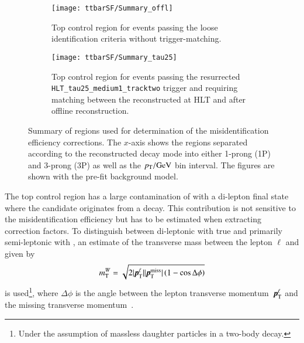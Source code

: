 \begin{figure}[htbp]
  \centering

  \begin{subfigure}[t]{.485\textwidth}
    \texttt{[image: ttbarSF/Summary\_offl]}
    \caption{Top control region for events passing the loose
      \tauhadvis identification criteria without trigger-matching.}
  \end{subfigure}\hfill%
  \begin{subfigure}[t]{.485\textwidth}
    \texttt{[image: ttbarSF/Summary\_tau25]}
    \caption{Top control region for events passing the resurrected
      \texttt{HLT\_tau25\_medium1\_tracktwo} trigger and requiring
      matching between the reconstructed \tauhadvis at HLT and after
      offline \tauhadvis reconstruction.}
  \end{subfigure}

  \caption{Summary of regions used for determination of the
    \jettotauhadvis misidentification efficiency corrections. The
    $x$-axis shows the regions separated according to the
    reconstructed decay mode into either 1-prong (1P) and 3-prong (3P)
    \tauhadvis as well as the \tauhadvis $\pT /\si{\GeV}$ bin
    interval. The figures are shown with the pre-fit background
    model.}
  \label{fig:ttbarsf_region_summary_prefit}
\end{figure}

The top control region has a large contamination of \ttbar with a
di-lepton final state where the \tauhadvis candidate originates from a
\tauhad decay. This contribution is not sensitive to the
\jettotauhadvis misidentification efficiency but has to be estimated
when extracting correction factors. To distinguish between di-leptonic
\ttbar with true \tauhadvis and primarily semi-leptonic \ttbar with
\faketauhadvis, an estimate of the transverse mass between the lepton
$\ell$ and \pTmissAbs given by
\begin{align*}
  \mTW = \sqrt{2 | \myvec{p}_{\text{T}}^{\ell} | | \pTmiss | \left( 1 - \cos \Delta\phi \right)}
\end{align*}
is used\footnote{Under the assumption of massless daughter particles
  in a two-body decay.}, where $\Delta \phi$ is the angle between the
lepton transverse momentum~$\myvec{p}_{\text{T}}^{\ell}$ and the
missing transverse momentum~\pTmiss.

